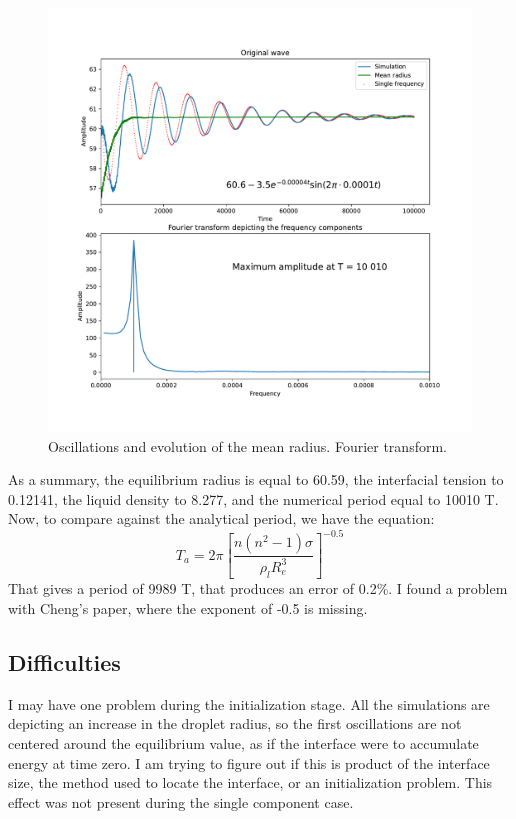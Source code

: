 \documentclass[12pt]{article}
\begin{document}
	\begin{figure}[h]
		\centering
		\includegraphics[scale=0.5]{pics/fourier.pdf}
		\caption{Oscillations and evolution of the mean radius. Fourier transform.}
		\label{fig:2cOsc}
	\end{figure}
	
	As a summary, the equilibrium radius is equal to 60.59, the interfacial tension to 0.12141, the liquid density to 8.277, and the numerical period equal to 10010 T. Now, to compare against the analytical period, we have the equation:
	\begin{equation}
		T_a = 2 \pi \left[ \frac{n (n^2-1) \sigma}{\rho_l R_e^3} \right]^{-0.5}
	\end{equation}
	That gives a period of 9989 T, that produces an error of 0.2\%. I found a problem with Cheng's paper, where the exponent of -0.5 is missing. 
	
	\subsection*{Difficulties}
	I may have one problem during the initialization stage. All the simulations are depicting an increase in the droplet radius, so the first oscillations are not centered around the equilibrium value, as if the interface were to accumulate energy at time zero. I am trying to figure out if this is product of the interface size, the method used to locate the interface, or an initialization problem. This effect was not present during the single component case.
	
\end{document}
